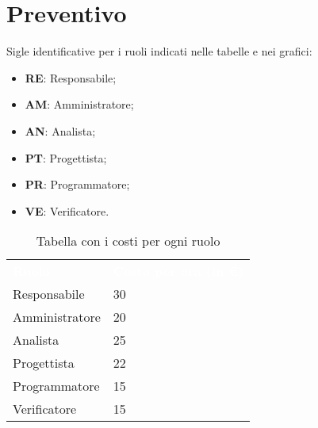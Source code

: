 \section{Preventivo}
Sigle identificative per i ruoli indicati nelle tabelle e nei grafici:
\begin{itemize}
    \item \textbf{RE}: Responsabile;
    \item \textbf{AM}: Amministratore;
    \item \textbf{AN}: Analista;
    \item \textbf{PT}: Progettista;
    \item \textbf{PR}: Programmatore;
    \item \textbf{VE}: Verificatore.
\end{itemize}

{	
\renewcommand{\arraystretch}{2}
\centering
\begin{longtable}[h!]{ C{3cm} C{4cm}}
\caption{Tabella con i costi per ogni ruolo}\\

\textcolor{white}{\textbf{Ruolo}} & \textcolor{white}{\textbf{Costo per ora (in \euro{})}}\\

Responsabile   & 30 \\
Amministratore & 20 \\
Analista       & 25 \\
Progettista    & 22 \\
Programmatore  & 15 \\
Verificatore   & 15 \\
\end{longtable}
}

\clearpage


\clearpage


\clearpage


\clearpage


\clearpage
